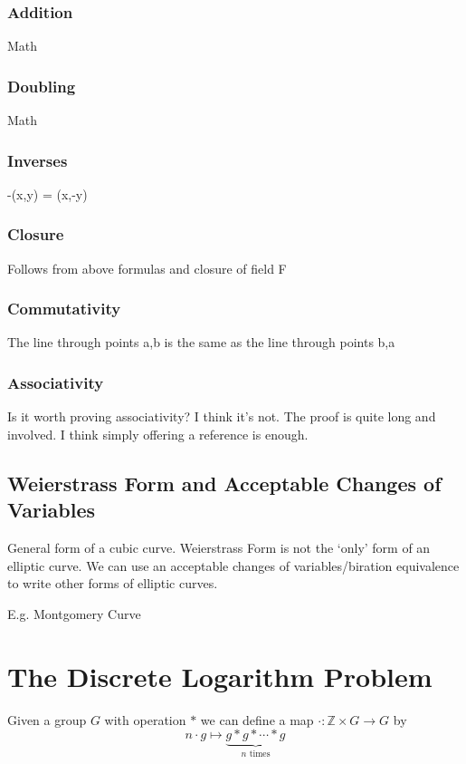\documentclass{article}
\begin{document}
\subsubsection{Addition}
Math

\subsubsection{Doubling}
Math

\subsubsection{Inverses}
-(x,y) = (x,-y)

\subsubsection{Closure}
Follows from above formulas and closure of field F

\subsubsection{Commutativity}
The line through points a,b is the same as the line through points b,a

\subsubsection{Associativity}
Is it worth proving associativity? I think it's not.
The proof is quite long and involved.
I think simply offering a reference is enough.

\subsection{Weierstrass Form and Acceptable Changes of Variables}
General form of a cubic curve.
Weierstrass Form is not the `only' form of an elliptic curve. 
We can use an acceptable changes of variables/biration equivalence to write other forms of elliptic curves.

E.g. Montgomery Curve

\clearpage

\section{The Discrete Logarithm Problem}
Given a group $G$ with operation $*$ we can define a map $\cdot: \mathbb{Z} \times G \to G$ by
$$n\cdot g \mapsto \underbrace{g * g * \cdots * g}_{n\text{ times}}$$
\end{document}
